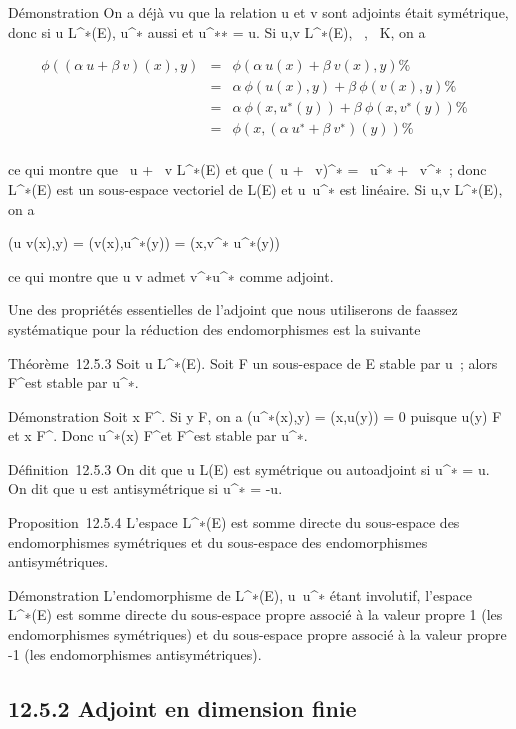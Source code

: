 \documentclass[]{article}
\begin{document}
Démonstration On a déjà vu que la relation u et v sont adjoints était
symétrique, donc si u \in L^∗(E), u^∗ aussi et
u^∗∗ = u. Si u,v \in L^∗(E), \alpha~,\beta~ \in K, on a

\begin{align*} \phi((\alpha~u + \beta~v)(x),y)& =& \phi(\alpha~u(x) +
\beta~v(x),y) \%& \\ & =& \alpha~\phi(u(x),y) +
\beta~\phi(v(x),y) \%& \\ & =&
\alpha~\phi(x,u^∗(y)) + \beta~\phi(x,v^∗(y))\%&
\\ & =& \phi(x,(\alpha~u^∗ +
\beta~v^∗)(y)) \%& \\
\end{align*}

ce qui montre que \alpha~u + \beta~v \in L^∗(E) et que (\alpha~u +
\beta~v)^∗ = \alpha~u^∗ + \beta~v^∗~; donc
L^∗(E) est un sous-espace vectoriel de L(E) et
u\mapsto~u^∗ est linéaire. Si u,v \in
L^∗(E), on a

\phi(u \cdot v(x),y) = \phi(v(x),u^∗(y)) = \phi(x,v^∗\cdot
u^∗(y))

ce qui montre que u \cdot v admet v^∗\cdot u^∗ comme
adjoint.

Une des propriétés essentielles de l'adjoint que nous utiliserons de
fa\ccon assez systématique pour la réduction des
endomorphismes est la suivante

Théorème~12.5.3 Soit u \in L^∗(E). Soit F un sous-espace de E
stable par u~; alors F^\bot est stable par u^∗.

Démonstration Soit x \in F^\bot. Si y \in F, on a
\phi(u^∗(x),y) = \phi(x,u(y)) = 0 puisque u(y) \in F et x \in
F^\bot. Donc u^∗(x) \in F^\bot et
F^\bot est stable par u^∗.

Définition~12.5.3 On dit que u \in L(E) est symétrique ou autoadjoint si
u^∗ = u. On dit que u est antisymétrique si u^∗ =
-u.

Proposition~12.5.4 L'espace L^∗(E) est somme directe du
sous-espace des endomorphismes symétriques et du sous-espace des
endomorphismes antisymétriques.

Démonstration L'endomorphisme de L^∗(E),
u\mapsto~u^∗ étant involutif, l'espace
L^∗(E) est somme directe du sous-espace propre associé à la
valeur propre 1 (les endomorphismes symétriques) et du sous-espace
propre associé à la valeur propre -1 (les endomorphismes
antisymétriques).

\subsection{12.5.2 Adjoint en dimension finie}
\end{document}
